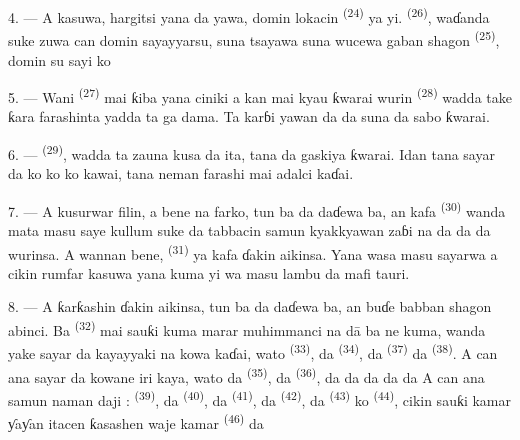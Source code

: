 \VUsaut{4.0mm}
\VUsaut{3.0mm}

4. --- A kasuwa, hargitsi yana da yawa, domin lokacin  \textsuperscript{(24)} ya yi. 
\textsuperscript{(26)}, waɗanda suke zuwa can domin sayayyarsu, suna tsayawa
suna wucewa gaban shagon 
\textsuperscript{(25)}, domin su sayi  ko 

5. --- Wani  \textsuperscript{(27)} mai ƙiba yana ciniki a
kan  mai kyau ƙwarai wurin 
\textsuperscript{(28)} wadda take ƙara farashinta yadda ta ga dama. Ta
karɓi yawan  da
  da  suna da sabo ƙwarai.

\VUsaut{4.0mm}
\VUsaut{3.0mm}

6. ---  \textsuperscript{(29)}, wadda ta
zauna kusa da ita, tana da gaskiya ƙwarai. Idan tana sayar da
 ko  ko  ko
 kawai, tana neman farashi mai adalci kaɗai.

7. --- A kusurwar filin, a bene na farko, tun ba da daɗewa ba, an kafa
 \textsuperscript{(30)} wanda mata masu saye kullum
suke da tabbacin samun kyakkyawan zaɓi na  da
 da  da 
wurinsa. A wannan bene,  \textsuperscript{(31)} ya kafa
ɗakin aikinsa. Yana wasa  masu sayarwa a cikin rumfar
kasuwa yana kuma yi wa masu lambu  da  mafi
tauri.

\VUsaut{4.0mm}
\VUsaut{3.0mm}

8. --- A ƙarƙashin ɗakin aikinsa, tun ba da daɗewa ba, an buɗe babban
shagon abinci. Ba  \textsuperscript{(32)} mai sauƙi
kuma marar muhimmanci na dā ba ne kuma, wanda yake sayar da kayayyaki
na kowa kaɗai, wato  \textsuperscript{(33)}, da
 \textsuperscript{(34)}, da 
\textsuperscript{(37)} da  \textsuperscript{(38)}. A can ana sayar da
kowane iri kaya, wato  da 
\textsuperscript{(35)}, da  \textsuperscript{(36)}, da
 da  da  da  da  A can ana samun naman daji :  \textsuperscript{(39)}, da 
\textsuperscript{(40)}, da  \textsuperscript{(41)}, da
 \textsuperscript{(42)}, da 
\textsuperscript{(43)} ko  \textsuperscript{(44)}, cikin sauƙi kamar
ƴaƴan itacen ƙasashen waje kamar  \textsuperscript{(46)} da


